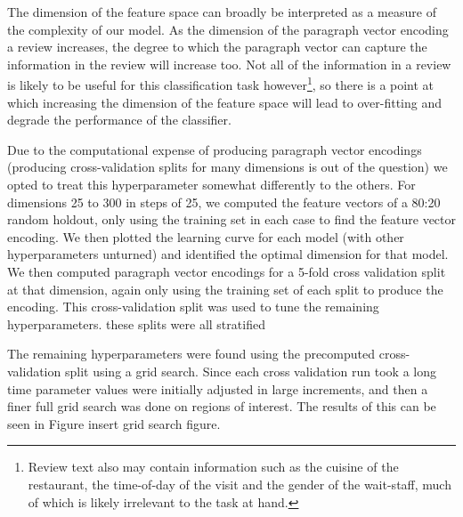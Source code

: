 \documentclass[11pt]{article}
\newcommand{\drafting}[1]{\textcolor{OliveGreen}{#1}}
\begin{document}
The dimension of the feature space can broadly be interpreted as a measure of the complexity of our model. As the dimension of the paragraph vector encoding a review increases, the degree to which the paragraph vector can capture the information in the review will increase too. Not all of the information in a review is likely to be useful for this classification task however\footnote{Review text also may contain information such as the cuisine of the restaurant, the time-of-day of the visit and the gender of the wait-staff, much of which is likely irrelevant to the task at hand.}, so there is a point at which increasing the dimension of the feature space will lead to over-fitting and degrade the performance of the classifier. 

Due to the computational expense of producing paragraph vector encodings (producing cross-validation splits for many dimensions is out of the question) we opted to treat this hyperparameter somewhat differently to the others. For dimensions 25 to 300 in steps of 25, we computed the feature vectors of a 80:20 random holdout, only using the training set in each case to find the feature vector encoding. We then plotted the learning curve for each model (with other hyperparameters unturned) and identified the optimal dimension for that model. We then computed paragraph vector encodings for a 5-fold cross validation split at that dimension, again only using the training set of each split to produce the encoding. This cross-validation split was used to tune the remaining hyperparameters. \drafting{these splits were all stratified}

The remaining hyperparameters were found using the precomputed cross-validation split using a grid search. Since each cross validation run \drafting{took a long time} parameter values were initially adjusted in large increments, and then a finer full grid search was done on regions of interest. The results of this can be seen in Figure \drafting{insert grid search figure}.



\nocite{mukherjee_what_2013}
\nocite{rayana_collective_2015}

\nocite{sklearn_pedregosa_scikit-learn_2011}
\nocite{gensim_rehurek_software_2010}


\end{document}
